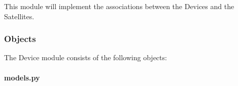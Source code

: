 This module will implement the associations between the Devices and the Satellites. 

\subsubsection{Objects}

The Device module consists of the following objects:

\paragraph{models.py}

